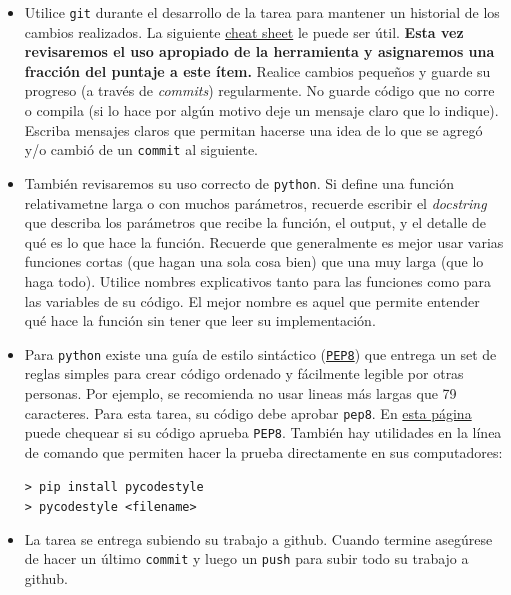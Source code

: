 \documentclass[letter, 11pt]{article}
\begin{document}
\vspace{1em}
\begin{itemize}

  \item Utilice \texttt{git} durante el desarrollo de la tarea para mantener un
    historial de los cambios realizados. La siguiente
    \href{https://education.github.com/git-cheat-sheet-education.pdf}{cheat
      sheet} le puede ser útil. \textbf{Esta vez revisaremos el uso apropiado
    de la herramienta y asignaremos una fracción del puntaje a este ítem.}
    Realice cambios pequeños y guarde su progreso (a través de \emph{commits})
    regularmente. No guarde código que no corre o compila (si lo hace por algún
    motivo deje un mensaje claro que lo indique). Escriba mensajes claros que
    permitan hacerse una idea de lo que se agregó y/o cambió de un
    \texttt{commit} al siguiente.

  \item También revisaremos su uso correcto de \texttt{python}. Si define una
    función relativametne larga o con muchos parámetros, recuerde escribir el
    \emph{docstring} que describa los parámetros que recibe la función, el
    output, y el detalle de qué es lo que hace la función. Recuerde que
    generalmente es mejor usar varias funciones cortas (que hagan una sola cosa
    bien) que una muy larga (que lo haga todo).  Utilice nombres explicativos
    tanto para las funciones como para las variables de su código.  El mejor
    nombre es aquel que permite entender qué hace la función sin tener que leer
    su implementación.

  \item Para \texttt{python} existe una guía de estilo sintáctico
    (\texttt{\href{https://www.python.org/dev/peps/pep-0008/}{PEP8}}) que
    entrega un set de reglas simples para crear código ordenado y fácilmente
    legible por otras personas. Por ejemplo, se recomienda no usar lineas más
    largas que 79 caracteres. Para esta tarea, su código debe aprobar
    \texttt{pep8}. En \href{http://pep8online.com}{esta página} puede chequear
    si su código aprueba \texttt{PEP8}. También hay utilidades en la línea de
    comando que permiten hacer la prueba directamente en sus computadores: 
    
    \texttt{>\ pip install pycodestyle}\\
    \texttt{>\ pycodestyle <filename>}

  \item La tarea se entrega subiendo su trabajo a github. Cuando termine
    asegúrese de hacer un último \texttt{commit} y luego un \texttt{push} para
    subir todo su trabajo a github.


\end{itemize}
\end{document}
